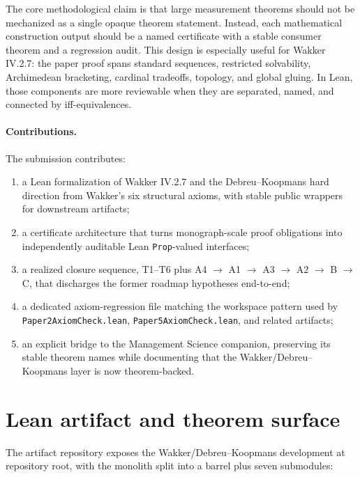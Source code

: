 \documentclass[11pt,english]{article}
\begin{document}
The core methodological claim is that large measurement theorems should not be mechanized as a single opaque theorem statement.  Instead, each mathematical construction output should be a named certificate with a stable consumer theorem and a regression audit.  This design is especially useful for Wakker IV.2.7: the paper proof spans standard sequences, restricted solvability, Archimedean bracketing, cardinal tradeoffs, topology, and global gluing.  In Lean, those components are more reviewable when they are separated, named, and connected by iff-equivalences.

\paragraph{Contributions.}
The submission contributes:
\begin{enumerate}[leftmargin=*]
\item a Lean formalization of Wakker IV.2.7 and the Debreu--Koopmans hard direction from Wakker's six structural axioms, with stable public wrappers for downstream artifacts;
\item a certificate architecture that turns monograph-scale proof obligations into independently auditable Lean \texttt{Prop}-valued interfaces;
\item a realized closure sequence, T1--T6 plus A4 \(\to\) A1 \(\to\) A3 \(\to\) A2 \(\to\) B \(\to\) C, that discharges the former roadmap hypotheses end-to-end;
\item a dedicated axiom-regression file matching the workspace pattern used by \texttt{Paper2AxiomCheck.lean}, \texttt{Paper5AxiomCheck.lean}, and related artifacts;
\item an explicit bridge to the Management Science companion, preserving its stable theorem names while documenting that the Wakker/Debreu--Koopmans layer is now theorem-backed.
\end{enumerate}

\section{Lean artifact and theorem surface}
\label{sec:artifact}

The artifact repository exposes the Wakker/Debreu--Koopmans development at repository root, with the monolith split into a barrel plus seven submodules:
\end{document}
